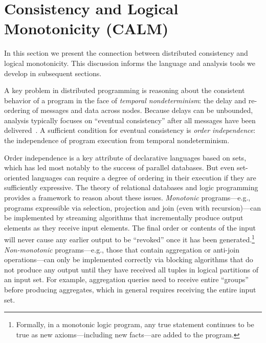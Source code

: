 \section{Consistency and Logical \\ Monotonicity (CALM)}
\label{sec:calm}
In this section we present the connection between distributed consistency and logical monotonicity.  This discussion informs the language and analysis tools we develop in subsequent sections.

A key problem in distributed programming is reasoning about the consistent behavior of a program in the face of {\em
temporal nondeterminism}: the delay and re-ordering of messages and data across
nodes.  Because delays can be unbounded, analysis typically focuses on ``eventual consistency'' after all messages have been delivered~\cite{vogels}.  A sufficient condition for eventual consistency is {\em order independence}: the independence of program execution from temporal
nondeterminism.

Order independence is a key attribute of declarative languages based on sets, which has led most notably to the success of parallel databases.  But even set-oriented languages can require a degree of ordering in their execution if they are sufficiently expressive.
The theory of relational databases and logic programming provides a framework to reason about these issues. \emph{Monotonic} programs---e.g., programs expressible via selection, projection and join (even with recursion)---can be implemented by streaming algorithms that incrementally produce output elements as they receive input elements. The final order or contents of the input will never cause any earlier output to be ``revoked'' once it has been generated.\footnote{Formally, in a monotonic logic program, any true statement continues to be true as new axioms---including new facts---are added to the program.}   
\emph{Non-monotonic} programs---e.g., those that contain aggregation or anti-join operations---can only be implemented correctly via blocking algorithms that do not produce any output until they have received all tuples in logical partitions of an input set. 
For example, aggregation queries need to receive entire ``groups'' before producing aggregates, which in general requires receiving the entire input set.

